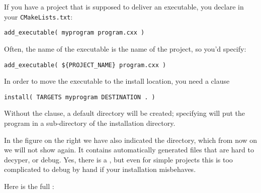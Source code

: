 \begin{floatingfigure}[r]{2.5in}
  \begin{minipage}{2.5in}
  \end{minipage}
\end{floatingfigure}
%
If you have a project that is supposed to deliver an executable,
you declare in your \texttt{CMakeLists.txt}:
\begin{lstlisting}
add_executable( myprogram program.cxx )
\end{lstlisting}
Often, the name of the executable is the name of the project,
so you'd specify:
\begin{lstlisting}
add_executable( ${PROJECT_NAME} program.cxx )
\end{lstlisting}
%
In order to move the executable to the install location,
you need a clause
\begin{lstlisting}
install( TARGETS myprogram DESTINATION . )
\end{lstlisting}
Without the  clause, a default  directory
will be created; specifying  will put the
program in a  sub-directory of the installation directory.

\begin{floatingfigure}[r]{2.5in}\begin{minipage}{2.5in}\hbox{}\vskip 4in\hbox{}\end{minipage}\end{floatingfigure}%
%
In the figure on the right we have also indicated the  directory,
which from now on we will not show again.
It contains automatically generated files that are hard to
decyper, or debug. Yes, there is a , but even for simple
projects this is too complicated to debug by hand if your 
installation misbehaves.

Here is the full :
%


